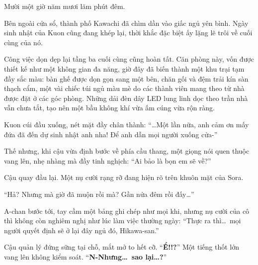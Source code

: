 \documentclass[../main.tex]{subfiles}
\begin{document}
\color{black}


Mười một giờ năm mươi lăm phút đêm.

Bên ngoài cửa sổ, thành phố Kawachi đã chìm dần vào giấc ngủ yên bình. Ngày sinh nhật của Kuon cũng đang khép lại, thời khắc đặc biệt ấy lặng lẽ trôi về cuối cùng của nó.

Công việc dọn dẹp lại tầng ba cuối cùng cũng hoàn tất. Căn phòng này, vốn được thiết kế như một không gian đa năng, giờ đây đã biến thành một khu trại tạm đầy sắc màu: bàn ghế được dọn gọn sang một bên, chăn gối và đệm trải kín sàn thạch cẩm, một vài chiếc túi ngủ màu mè do các thành viên mang theo từ nhà được đặt ở các góc phòng. Những dải đèn dây LED lung linh dọc theo trần nhà vẫn chưa tắt, tạo nên một bầu không khí vừa ấm cúng vừa rộn ràng.

Kuon cúi đầu xuống, nét mặt đầy chân thành: ``\dots Một lần nữa, anh cảm ơn mấy đứa đã đến dự sinh nhật anh nha! Để anh dẫn mọi người xuống cửa-''

Thế nhưng, khi cậu vừa định bước về phía cầu thang, một giọng nói quen thuộc vang lên, nhẹ nhàng mà đầy tinh nghịch: ``Ai bảo là bọn em sẽ về?''

Cậu quay đầu lại. Một nụ cười rạng rỡ đang hiện rõ trên khuôn mặt của Sora.

``Hả? Nhưng mà giờ đã muộn rồi mà? Gần nửa đêm rồi đấy\dots''

A-chan bước tới, tay cầm một bảng ghi chép như mọi khi, nhưng nụ cười của cô thì không còn nghiêm nghị như lúc làm việc thường ngày: ``Thực ra thì\dots\ mọi người quyết định sẽ ở lại đây ngủ đó, Hikawa-san.''

Cậu quản lý đứng sững tại chỗ, mắt mở to hết cỡ. ``\textbf{Ể!!?}'' Một tiếng thốt lớn vang lên không kiểm soát. ``\textbf{N-Nhưng\dots\ sao lại\dots?}''
\end{document}
